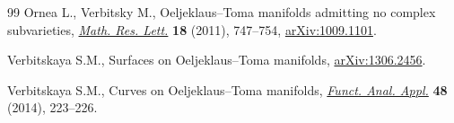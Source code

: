 \documentclass[pdftex]{sigma}
\newcommand{\6}{\partial}
\numberwithin{equation}{section}
\begin{document}
\begin{thebibliography}{99}
Ornea L., Verbitsky M., Oeljeklaus--{T}oma manifolds admitting no complex
 subvarieties,
 \href{https://doi.org/10.4310/MRL.2011.v18.n4.a12}{\textit{Math. Res. Lett.}}
 \textbf{18} (2011), 747--754,
 \href{http://arxiv.org/abs/1009.1101}{arXiv:1009.1101}.

Verbitskaya S.M., Surfaces on {O}eljeklaus--{T}oma manifolds,
 \href{http://arxiv.org/abs/1306.2456}{arXiv:1306.2456}.

Verbitskaya S.M., Curves on {O}eljeklaus--{T}oma manifolds,
 \href{https://doi.org/10.1007/s10688-014-0063-y}{\textit{Funct. Anal. Appl.}}
 \textbf{48} (2014), 223--226.

\end{thebibliography}\LastPageEnding
\end{document}
